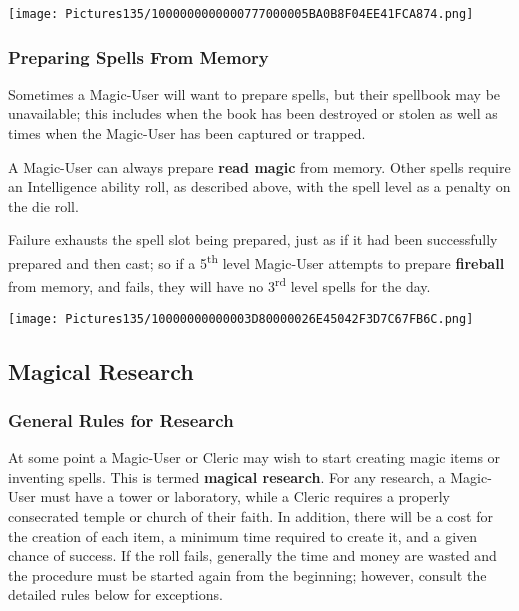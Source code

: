 \documentclass[a4paper,twoside,openany,10pt]{book}
\begin{document}
\begin{multicols}{2}
 \begin{center}
 	\texttt{[image: Pictures135/1000000000000777000005BA0B8F04EE41FCA874.png]} 
 \end{center}

\subsubsection{Preparing Spells From Memory}\label{preparing-spells-from-memory}

Sometimes a Magic-User will want to prepare spells, but their spellbook may be unavailable; this includes when the book has been destroyed or stolen as well as times when the Magic-User has been captured or trapped.

A Magic-User can always prepare \textbf{read magic} from memory. Other spells require an Intelligence ability roll, as described above, with the spell level as a penalty on the die roll.

Failure exhausts the spell slot being prepared, just as if it had been successfully prepared and then cast; so if a 5\textsuperscript{th} level Magic-User attempts to prepare \textbf{fireball} from memory, and fails, they will have no 3\textsuperscript{rd} level spells for the day.

\begin{center}
	\texttt{[image: Pictures135/10000000000003D80000026E45042F3D7C67FB6C.png]}
\end{center}

\subsection{Magical Research}\label{magical-research}

\subsubsection{General Rules for Research}\label{general-rules-for-research}

At some point a Magic-User or Cleric may wish to start creating magic items or inventing spells. This is termed \textbf{magical research}. For any research, a Magic-User must have a tower or laboratory, while a Cleric requires a properly consecrated temple or church of their faith. In addition, there will be a cost for the creation of each item, a minimum time required to create it, and a given chance of success. If the roll fails, generally the time and money are wasted and the procedure must be started again from the beginning; however, consult the detailed rules below for exceptions.


\end{multicols}
\end{document}
